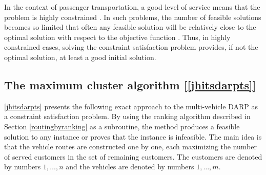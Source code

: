 \documentclass[dissertation,draft*]{aaltoseries}
\begin{document}
In the context of passenger transportation, a good level of service means that the problem is highly constrained \cite{jokinen-fists-2011}. 
In such problems, the number of feasible solutions becomes so limited that often
any feasible solution will be relatively close to the optimal solution with respect to the
objective function \cite{psaraftis02}.
Thus, in highly constrained cases, solving the constraint satisfaction problem provides, 
if not the optimal solution, at least a good initial solution. 



\subsection{The maximum cluster algorithm [\ref{jhitsdarpts}]}
\label{mvsolution}
\ref{jhitsdarpts} presents the following exact approach to the multi-vehicle DARP as a constraint satisfaction problem.
By using the ranking algorithm  described in Section \ref{routingbyranking} as a subroutine,
 the method produces a feasible solution to 
any instance or proves that the instance is infeasible. The main idea is that the vehicle routes are constructed
one by one, each maximizing the number of served customers in the set of remaining customers.
The customers are denoted by numbers $1,\ldots,n$ and the vehicles are denoted by numbers $1,\ldots,m$.
\end{document}
